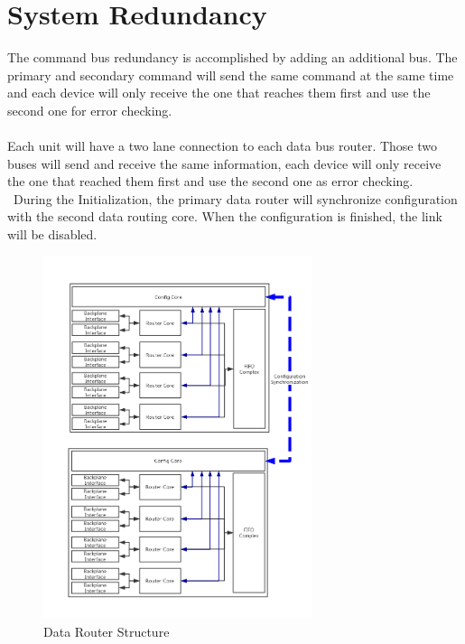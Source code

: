 \documentclass[12pt,article]{memoir}
\begin{document}
\section{System Redundancy}
The command bus redundancy is accomplished by adding an additional bus. The primary and secondary command will send the same command at the same time and each device will only receive the one that reaches them first and use the second one for error checking.\\\\
Each unit will have a two lane connection to each data bus router. Those two buses will send and receive the same information, each device will only receive the one that reached them first and use the second one as error checking.\\\
During the Initialization, the primary data router will synchronize configuration with the second data routing core. When the configuration is finished, the link will be disabled.
\begin{figure}[htp]
\begin{center}
\includegraphics[width=0.7\textwidth]{img/DR00001_SpaceWire_2.png}
 \caption{Data Router Structure}
\end{center}
\end{figure}
\clearpage
\end{document}
